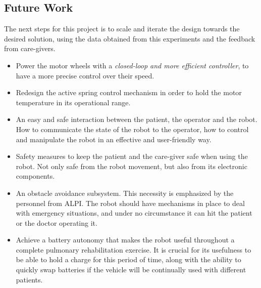 \documentclass[journal]{IEEEtran}
\begin{document}
\subsection{Future Work}

The next steps for this project is to scale and iterate the design towards the desired solution, using the data obtained from this experiments and the feedback from care-givers.

\begin{itemize}
    \item Power the motor wheels with a \textit{closed-loop and more efficient controller}, to have a more precise control over their speed.
    \item Redesign the active spring control mechanism in order to hold the motor temperature in its operational range.
    \item An easy and safe interaction between the patient, the operator and the robot. How to communicate the state of the robot to the operator, how to control and manipulate the robot in an effective and user-friendly way.
    \item Safety measures to keep the patient and the care-giver safe when using the robot. Not only safe from the robot movement, but also from its electronic components.
    \item An obstacle avoidance subsystem. This necessity is emphasized by the personnel from ALPI. The robot should have mechanisms in place to deal with emergency situations, and under no circumstance it can hit the patient or the doctor operating it.
    \item Achieve a battery autonomy that makes the robot useful throughout a complete pulmonary rehabilitation exercise. It is crucial for its usefulness to be able to hold a charge for this period of time, along with the ability to quickly swap batteries if the vehicle will be continually used with different patients.
\end{itemize}{}




\end{document}
